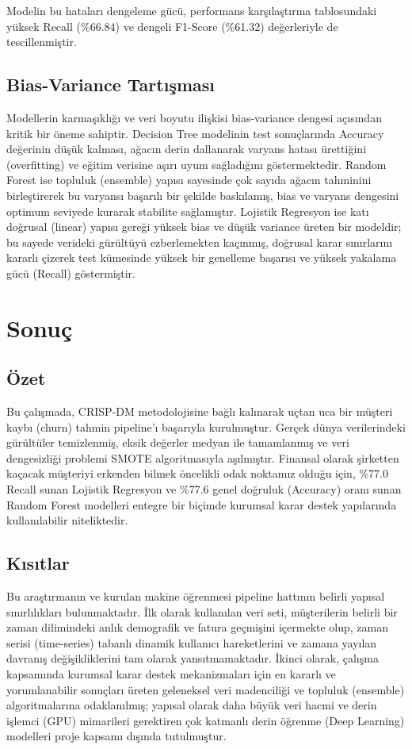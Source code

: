 \documentclass[11pt,a4paper]{article}
\begin{document}
Modelin bu hataları dengeleme gücü, performans karşılaştırma tablosundaki yüksek Recall (\%66.84) ve dengeli F1-Score (\%61.32) değerleriyle de tescillenmiştir.


	\subsection{Bias-Variance Tartışması}
Modellerin karmaşıklığı ve veri boyutu ilişkisi bias-variance dengesi açısından kritik bir öneme sahiptir. Decision Tree modelinin test sonuçlarında Accuracy değerinin düşük kalması, ağacın derin dallanarak varyans hatası ürettiğini (overfitting) ve eğitim verisine aşırı uyum sağladığını göstermektedir. Random Forest ise topluluk (ensemble) yapısı sayesinde çok sayıda ağacın tahminini birleştirerek bu varyansı başarılı bir şekilde baskılamış, bias ve varyans dengesini optimum seviyede kurarak stabilite sağlamıştır. Lojistik Regresyon ise katı doğrusal (linear) yapısı gereği yüksek bias ve düşük variance üreten bir modeldir; bu sayede verideki gürültüyü ezberlemekten kaçınmış, doğrusal karar sınırlarını kararlı çizerek test kümesinde yüksek bir genelleme başarısı ve yüksek yakalama gücü (Recall) göstermiştir.

	\section{Sonuç}

    

\subsection{Özet}
Bu çalışmada, CRISP-DM metodolojisine bağlı kalınarak uçtan uca bir müşteri kaybı (churn) tahmin pipeline'ı başarıyla kurulmuştur. Gerçek dünya verilerindeki gürültüler temizlenmiş, eksik değerler medyan ile tamamlanmış ve veri dengesizliği problemi SMOTE algoritmasıyla aşılmıştır. Finansal olarak şirketten kaçacak müşteriyi erkenden bilmek öncelikli odak noktamız olduğu için, \%77.0 Recall sunan Lojistik Regresyon ve \%77.6 genel doğruluk (Accuracy) oranı sunan Random Forest modelleri entegre bir biçimde kurumsal karar destek yapılarında kullanılabilir niteliktedir.

\subsection{Kısıtlar}
Bu araştırmanın ve kurulan makine öğrenmesi pipeline hattının belirli yapısal sınırlılıkları bulunmaktadır. İlk olarak kullanılan veri seti, müşterilerin belirli bir zaman dilimindeki anlık demografik ve fatura geçmişini içermekte olup, zaman serisi (time-series) tabanlı dinamik kullanıcı hareketlerini ve zamana yayılan davranış değişikliklerini tam olarak yansıtmamaktadır. İkinci olarak, çalışma kapsamında kurumsal karar destek mekanizmaları için en kararlı ve yorumlanabilir sonuçları üreten geleneksel veri madenciliği ve topluluk (ensemble) algoritmalarına odaklanılmış; yapısal olarak daha büyük veri hacmi ve derin işlemci (GPU) mimarileri gerektiren çok katmanlı derin öğrenme (Deep Learning) modelleri proje kapsamı dışında tutulmuştur.
\end{document}
